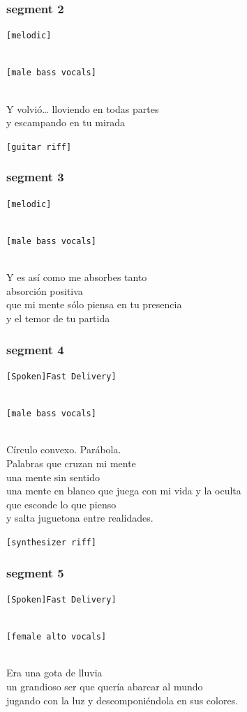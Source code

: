 \subsubsection{segment 2}\label{segment-2}

\texttt{{[}melodic{]}}\strut \\
\texttt{{[}male\ bass\ vocals{]}}\strut \\
Y volvió\ldots{} lloviendo en todas partes\\
y escampando en tu mirada

\texttt{{[}guitar\ riff{]}}

\subsubsection{segment 3}\label{segment-3}

\texttt{{[}melodic{]}}\strut \\
\texttt{{[}male\ bass\ vocals{]}}\strut \\
Y es así como me absorbes tanto\\
absorción positiva\\
que mi mente sólo piensa en tu presencia\\
y el temor de tu partida

\subsubsection{segment 4}\label{segment-4}

\texttt{{[}Spoken{]}\textasciigrave{}\textasciigrave{}{[}Fast\ Delivery{]}}\strut \\
\texttt{{[}male\ bass\ vocals{]}}\strut \\
Círculo convexo. Parábola.\\
Palabras que cruzan mi mente\\
una mente sin sentido\\
una mente en blanco que juega con mi vida y la oculta\\
que esconde lo que pienso\\
y salta juguetona entre realidades.

\texttt{{[}synthesizer\ riff{]}}

\subsubsection{segment 5}\label{segment-5}

\texttt{{[}Spoken{]}\textasciigrave{}\textasciigrave{}{[}Fast\ Delivery{]}}\strut \\
\texttt{{[}female\ alto\ vocals{]}}\strut \\
Era una gota de lluvia\\
un grandioso ser que quería abarcar al mundo\\
jugando con la luz y descomponiéndola en sus colores.

